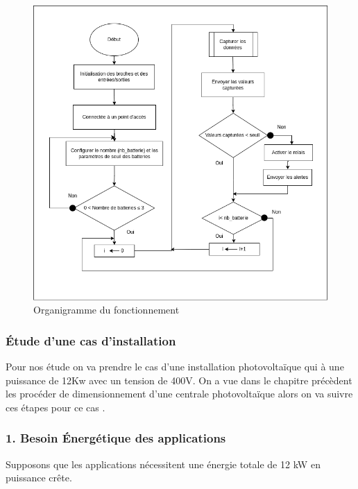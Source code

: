 \begin{figure}[H]
	\centering
	\includegraphics[width=15cm]{./img/organigramme.png}
	\caption{Organigramme du fonctionnement}
	\label{i1}
\end{figure}



\subsubsection{Étude d'une cas d'installation}

Pour nos étude on va prendre le cas d'une installation photovoltaïque qui à une puissance de 12Kw avec un tension de 400V.
On a vue dans le chapitre précèdent les procéder de dimensionnement d'une centrale photovoltaïque alors on va suivre ces étapes pour ce cas .


\subsubsection*{1. Besoin Énergétique des applications}
Supposons que les applications nécessitent une énergie totale de 12 kW en puissance crête.


